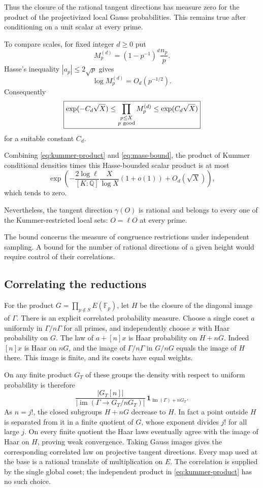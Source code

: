 \documentclass[11pt]{article}
\begin{document}
Thus the closure of the rational tangent directions has measure zero for the product of the projectivized local Gauss probabilities. This remains true after conditioning on a unit scalar at every prime.

To compare scales, for fixed integer
$d\ge0$ put
\[
M_p^{(d)}=
(1-p^{-1})^d\frac{n_p}{p}.
\]
Hasse's inequality $|a_p|\le2\sqrt p$
gives
\[
\log M_p^{(d)}=O_d(p^{-1/2}).
\]
Consequently
\begin{equation}\label{eq:mass-bound}
\boxed{
\exp(-C_d\sqrt X)
\le
\prod_{\substack{p\le X\\p\ {\rm good}}}
M_p^{(d)}
\le
\exp(C_d\sqrt X)}
\end{equation}
for a suitable constant $C_d$.

Combining \eqref{eq:kummer-product} and
\eqref{eq:mass-bound}, the product of
Kummer conditional densities times
this Hasse-bounded scalar product is
at most
\[
\exp\left(
-\frac{2\log\ell}{[K:\mathbb Q]}
\frac X{\log X}(1+o(1))
+O_d(\sqrt X)
\right),
\]
which tends to zero.

Nevertheless, the tangent direction
$\gamma(O)$ is rational and belongs
to every one of the Kummer-restricted
local sets: $O=\ell O$ at every prime.

The bound concerns the measure of congruence restrictions under
independent sampling. A bound for the number of rational directions
of a given height would require control of their correlations.

\subsection{Correlating the reductions}

For the product $G=\prod_{p\notin S}E(\mathbb F_p)$, let $H$ be
the closure of the diagonal image of $\Gamma$. There is an explicit
correlated probability measure. Choose a single coset $a$ uniformly
in $\Gamma/n\Gamma$ for all primes, and independently choose $x$ with
Haar probability on $G$. The law of $a+[n]x$ is Haar probability on
$H+nG$. Indeed $[n]x$ is Haar on $nG$, and the image of
$\Gamma/n\Gamma$ in $G/nG$ equals the image of $H$ there. This image
is finite, and its cosets have equal weights.

On any finite product $G_T$ of these groups the density with respect
to uniform probability is therefore
\[
 \frac{|G_T[n]|}{|\operatorname{im}(\Gamma\to G_T/nG_T)|}
 \,\mathbf1_{\operatorname{im}(\Gamma)+nG_T}.
\]
As $n=j!$, the closed subgroups $H+nG$ decrease to $H$.
In fact a point outside $H$ is separated from it in a finite quotient
of $G$, whose exponent divides $j!$ for all large $j$. On every
finite quotient the Haar laws eventually agree with the image of Haar
on $H$, proving weak convergence. Taking Gauss images gives the
corresponding correlated law on projective tangent directions.
Every map used at the base is a rational translate of multiplication
on $E$. The correlation is supplied by the single global coset; the
independent product in \eqref{eq:kummer-product} has no such choice.
\end{document}
